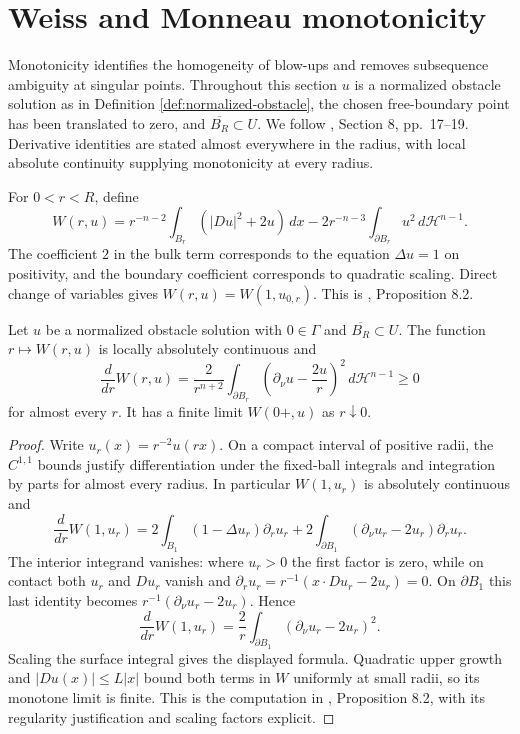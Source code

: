 \chapter{Weiss and Monneau monotonicity}\label{sec:obstacle-monotonicity}
Monotonicity identifies the homogeneity of blow-ups and removes subsequence ambiguity at singular points. Throughout this section $u$ is a normalized obstacle solution as in Definition \ref{def:normalized-obstacle}, the chosen free-boundary point has been translated to zero, and $\overline{B_R}\subset U$. We follow \cite{Fig18}, Section 8, pp.~17--19. Derivative identities are stated almost everywhere in the radius, with local absolute continuity supplying monotonicity at every radius.

\begin{definition}\label{def:obstacle-weiss-energy}
For $0<r<R$, define
\[
 W(r,u)=r^{-n-2}\int_{B_r}(|Du|^2+2u)\,dx
       -2r^{-n-3}\int_{\partial B_r}u^2\,d\mathcal H^{n-1}.
\]
The coefficient $2$ in the bulk term corresponds to the equation $\Delta u=1$ on positivity, and the boundary coefficient corresponds to quadratic scaling. Direct change of variables gives $W(r,u)=W(1,u_{0,r})$. This is \cite{Fig18}, Proposition 8.2.
\end{definition}

\begin{theorem}\label{thm:obstacle-weiss-monotonicity}
Let $u$ be a normalized obstacle solution with $0\in\Gamma$ and $\overline{B_R}\subset U$. The function $r\mapsto W(r,u)$ is locally absolutely continuous and
\[
 \frac{d}{dr}W(r,u)
 =\frac{2}{r^{n+2}}\int_{\partial B_r}
 \left(\partial_\nu u-\frac{2u}{r}\right)^2\,d\mathcal H^{n-1}
 \geq0
\]
for almost every $r$. It has a finite limit $W(0+,u)$ as $r\downarrow0$.
\end{theorem}
\begin{proof}
Write $u_r(x)=r^{-2}u(rx)$. On a compact interval of positive radii, the $C^{1,1}$ bounds justify differentiation under the fixed-ball integrals and integration by parts for almost every radius. In particular $W(1,u_r)$ is absolutely continuous and
\[
 \frac{d}{dr}W(1,u_r)
 =2\int_{B_1}(1-\Delta u_r)\partial_ru_r
  +2\int_{\partial B_1}(\partial_\nu u_r-2u_r)\partial_ru_r.
\]
The interior integrand vanishes: where $u_r>0$ the first factor is zero, while on contact both $u_r$ and $Du_r$ vanish and
$\partial_ru_r=r^{-1}(x\cdot Du_r-2u_r)=0$. On $\partial B_1$ this last identity becomes $r^{-1}(\partial_\nu u_r-2u_r)$. Hence
\[
 \frac{d}{dr}W(1,u_r)=\frac2r\int_{\partial B_1}(\partial_\nu u_r-2u_r)^2.
\]
Scaling the surface integral gives the displayed formula. Quadratic upper growth and $|Du(x)|\leq L|x|$ bound both terms in $W$ uniformly at small radii, so its monotone limit is finite. This is the computation in \cite{Fig18}, Proposition 8.2, with its regularity justification and scaling factors explicit.
\end{proof}

